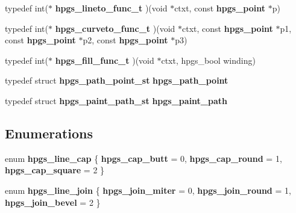 \begin{CompactItemize}
\item 
typedef int($\ast$ \textbf{hpgs\_\-lineto\_\-func\_\-t} )(void $\ast$ctxt, const {\bf hpgs\_\-point} $\ast$p)\label{group__font_gaa432603ef5a4185c0e7d23e280a45b8}

\item 
typedef int($\ast$ \textbf{hpgs\_\-curveto\_\-func\_\-t} )(void $\ast$ctxt, const {\bf hpgs\_\-point} $\ast$p1, const {\bf hpgs\_\-point} $\ast$p2, const {\bf hpgs\_\-point} $\ast$p3)\label{group__font_g0b886c68898c98c2aaf7536f97d7bcc5}

\item 
typedef int($\ast$ \textbf{hpgs\_\-fill\_\-func\_\-t} )(void $\ast$ctxt, hpgs\_\-bool winding)\label{group__font_gbad7cbae9e3d41a823f63520ab61c167}

\item 
typedef struct {\bf hpgs\_\-path\_\-point\_\-st} \textbf{hpgs\_\-path\_\-point}\label{group__path_gfc59f1822b1f6783bfcce4c824b911f4}

\item 
typedef struct {\bf hpgs\_\-paint\_\-path\_\-st} \textbf{hpgs\_\-paint\_\-path}\label{group__path_g13ce072f19c7638345701bd3fb2f6f31}

\end{CompactItemize}
\subsection*{Enumerations}
\begin{CompactItemize}
\item 
enum {\bf hpgs\_\-line\_\-cap} \{ {\bf hpgs\_\-cap\_\-butt} =  0, 
{\bf hpgs\_\-cap\_\-round} =  1, 
{\bf hpgs\_\-cap\_\-square} =  2
 \}
\item 
enum {\bf hpgs\_\-line\_\-join} \{ {\bf hpgs\_\-join\_\-miter} =  0, 
{\bf hpgs\_\-join\_\-round} =  1, 
{\bf hpgs\_\-join\_\-bevel} =  2
 \}
\end{CompactItemize}
